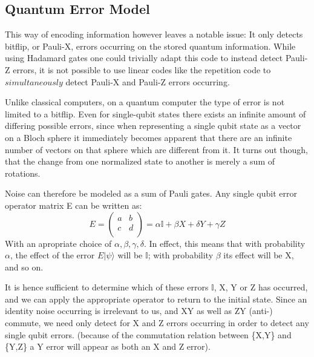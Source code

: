\subsection{Quantum Error Model}
This way of encoding information however leaves a notable
issue:
It only detects bitflip, or Pauli-X, errors occurring on
the stored quantum information. While using Hadamard gates one
could trivially adapt this code to instead detect Pauli-Z errors,
it is not possible to use linear codes like the repetition code
to $simultaneously$ detect Pauli-X and Pauli-Z errors occurring.

Unlike classical computers, on a quantum computer the type of error
 is not limited
to a bitflip. Even for single-qubit states there exists an
infinite amount of differing possible errors, since when representing a single
qubit state as a vector on a Bloch sphere it immediately becomes apparent
that there are an infinite number of vectors on that sphere which are different
from it. It turns out though, that the change from one normalized
state to another is merely a sum of rotations.

Noise can therefore be modeled as a sum of Pauli gates.
Any single qubit error operator matrix E can be written as:
\begin{equation}
    E =
    \left(
    \begin{array}{cc}
        a & b \\
        c & d \\
    \end{array}
    \right) = 
    \alpha \mathbb{I} + \beta X + \delta Y + \gamma Z
\end{equation}
With an apropriate choice of $\alpha, \beta, \gamma, \delta$.
In effect, this means that with probability $\alpha$, the effect of the
error $E|\psi\rangle$ will be $\mathbb{I}$; with probability $\beta$ its effect
will be X, and so on.

It is hence sufficient to determine which of these errors $\mathbb{I}$, 
X, Y or Z has occurred, and we can apply the appropriate operator to return to the 
initial state.
Since an identity noise occurring is irrelevant to us, and XY as
well as ZY (anti-) commute, we need only detect for X and Z
errors occurring in order to detect any single qubit errors. 
(because of the commutation relation between \{X,Y\} and \{Y,Z\} a Y error
will appear as both an X and Z error).